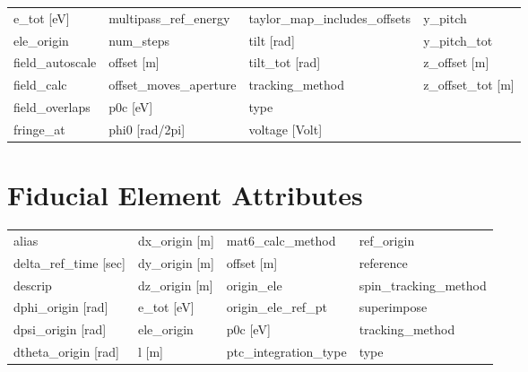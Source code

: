 \begin{tabular}{llll}
e_tot [eV]                       & multipass_ref_energy             & taylor_map_includes_offsets      & y_pitch                          \\
ele_origin                       & num_steps                        & tilt [rad]                       & y_pitch_tot                      \\
field_autoscale                  & offset [m]                       & tilt_tot [rad]                   & z_offset [m]                     \\
field_calc                       & offset_moves_aperture            & tracking_method                  & z_offset_tot [m]                 \\
field_overlaps                   & p0c [eV]                         & type                             &                                  \\
fringe_at                        & phi0 [rad/2pi]                   & voltage [Volt]                   &                                  \\
 \bottomrule
 \end{tabular}
 \vfill
 
 \section{Fiducial Element Attributes}
 \label{s:list.fiducial}
 
 \begin{tabular}{llll} \toprule
alias                            & dx_origin [m]                    & mat6_calc_method                 & ref_origin                       \\
delta_ref_time [sec]             & dy_origin [m]                    & offset [m]                       & reference                        \\
descrip                          & dz_origin [m]                    & origin_ele                       & spin_tracking_method             \\
dphi_origin [rad]                & e_tot [eV]                       & origin_ele_ref_pt                & superimpose                      \\
dpsi_origin [rad]                & ele_origin                       & p0c [eV]                         & tracking_method                  \\
dtheta_origin [rad]              & l [m]                            & ptc_integration_type             & type                             \\
 \bottomrule
 \end{tabular}
 \vfill
 
